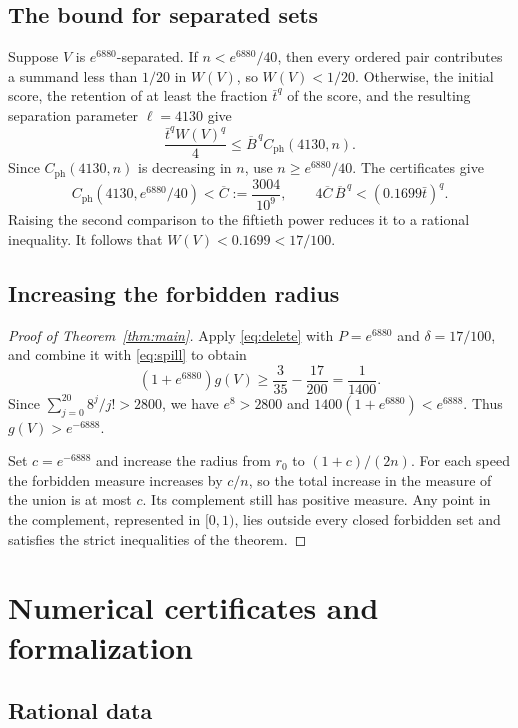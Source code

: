 \documentclass[11pt,a4paper]{article}
\begin{document}
\subsection{The bound for separated sets}

Suppose \(V\) is \(e^{6880}\)-separated. If \(n<e^{6880}/40\),
then every ordered pair contributes a summand less than \(1/20\)
in \(W(V)\), so \(W(V)<1/20\). Otherwise, the initial score, the
retention of at least the fraction \(\bar t^q\) of the score,
and the resulting separation parameter \(\ell=4130\) give
\[
 \frac{\bar t^q W(V)^q}{4}
   \le\overline B^{\,q} C_{\mathrm{ph}}(4130,n).
\]
Since \(C_{\mathrm{ph}}(4130,n)\) is decreasing in \(n\), use
\(n\ge e^{6880}/40\). The certificates give
\[
 C_{\mathrm{ph}}(4130,e^{6880}/40)<\overline C
       :=\frac{3004}{10^9},
 \qquad
 4\overline C\,\overline B^{\,q}<(0.1699\bar t)^q .
\]
Raising the second comparison to the fiftieth power reduces it
to a rational inequality. It follows that \(W(V)<0.1699<17/100\).

\subsection{Increasing the forbidden radius}

\begin{proof}[Proof of Theorem~\ref{thm:main}]
Apply \eqref{eq:delete} with \(P=e^{6880}\) and \(\delta=17/100\),
and combine it with \eqref{eq:spill} to obtain
\[
 (1+e^{6880})g(V)\ge \frac3{35}-\frac{17}{200}=\frac1{1400}.
\]
Since \(\sum_{j=0}^{20}8^j/j!>2800\), we have \(e^8>2800\) and
\(1400(1+e^{6880})<e^{6888}\). Thus \(g(V)>e^{-6888}\).

Set \(c=e^{-6888}\) and increase the radius from \(r_0\) to
\((1+c)/(2n)\). For each speed the forbidden measure increases
by \(c/n\), so the total increase in the measure of the union
is at most \(c\). Its complement still has positive measure.
Any point in the complement, represented in \([0,1)\), lies outside
every closed forbidden set and satisfies the strict inequalities
of the theorem.
\end{proof}

\appendix
\section{Numerical certificates and formalization}\label{sec:cert}

\subsection{Rational data}
\end{document}
